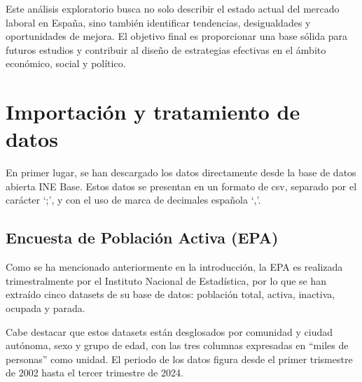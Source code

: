 \documentclass[notspecified,article,submit,moreauthors,pdftex]{Definitions/mdpi}
\begin{document}
Este análisis exploratorio busca no solo describir el estado actual del
mercado laboral en España, sino también identificar tendencias,
desigualdades y oportunidades de mejora. El objetivo final es
proporcionar una base sólida para futuros estudios y contribuir al
diseño de estrategias efectivas en el ámbito económico, social y
político.

\section{Importación y tratamiento de
datos}\label{importaciuxf3n-y-tratamiento-de-datos}

En primer lugar, se han descargado los datos directamente desde la base
de datos abierta INE Base. Estos datos se presentan en un formato de
csv, separado por el carácter `;', y con el uso de marca de decimales
española `,'.

\subsection{Encuesta de Población Activa
(EPA)}\label{encuesta-de-poblaciuxf3n-activa-epa}

Como se ha mencionado anteriormente en la introducción, la EPA es
realizada trimestralmente por el Instituto Nacional de Estadística, por
lo que se han extraído cinco datasets de su base de datos: población
total, activa, inactiva, ocupada y parada.

Cabe destacar que estos datasets están desglosados por comunidad y
ciudad autónoma, sexo y grupo de edad, con las tres columnas expresadas
en ``miles de personas'' como unidad. El periodo de los datos figura
desde el primer trismestre de 2002 hasta el tercer trimestre de 2024.
\end{document}
